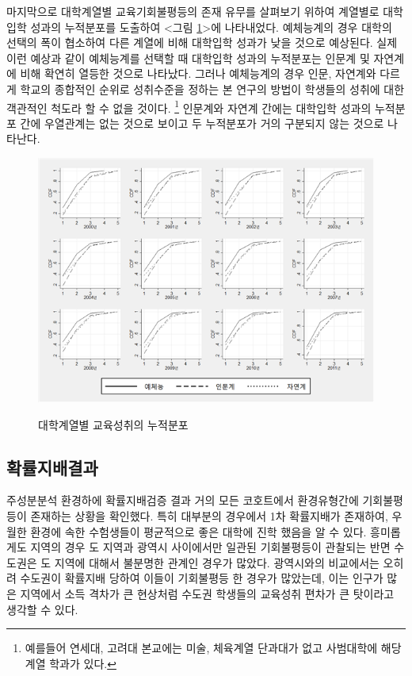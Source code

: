 마지막으로 대학계열별 교육기회불평등의 존재 유무를 살펴보기 위하여 계열별로 대학입학 성과의 누적분포를 도출하여 <그림 \ref{fig:goms_cdf_byfld}>에 나타내었다.
예체능계의 경우 대학의 선택의 폭이 협소하여 다른 계열에 비해 대학입학 성과가 낮을 것으로 예상된다.
 실제 이런 예상과 같이 예체능계를 선택할 때 대학입학 성과의 누적분포는 인문계 및 자연계에 비해 확연히 열등한 것으로 나타났다.
 그러나 예체능계의 경우 인문, 자연계와 다르게 학교의 종합적인 순위로 성취수준을 정하는 본 연구의 방법이 학생들의 성취에 대한 객관적인 척도라 할 수 없을 것이다.
 \footnote{ 예를들어 연세대, 고려대 본교에는 미술, 체육계열 단과대가 없고 사범대학에 해당계열 학과가 있다.}
 인문계와 자연계 간에는 대학입학 성과의 누적분포 간에 우열관계는 없는 것으로 보이고 두 누적분포가 거의 구분되지 않는 것으로 나타난다.
 
\begin{figure}
    \centering
    \caption{대학계열별 교육성취의 누적분포}
    \includegraphics[width=\textwidth]{figure/goms_cdf_byfld.png}
    \label{fig:goms_cdf_byfld}
\end{figure}

\subsection{확률지배결과}

주성분분석 환경하에 확률지배검증 결과 거의 모든 코호트에서 환경유형간에 기회불평등이 존재하는 상황을 확인했다.
특히 대부분의 경우에서 1차 확률지배가 존재하여, 우월한 환경에 속한 수험생들이 평균적으로 좋은 대학에 진학 했음을 알 수 있다.
흥미롭게도 지역의 경우 도 지역과 광역시 사이에서만 일관된 기회불평등이 관찰되는 반면 수도권은 도 지역에 대해서 불분명한 관계인 경우가 많았다.
 광역시와의 비교에서는 오히려 수도권이 확률지배 당하여 이들이 기회불평등 한 경우가 많았는데, 이는 인구가 많은 지역에서 소득 격차가 큰 현상처럼 수도권 학생들의 교육성취 편차가 큰 탓이라고 생각할 수 있다.
 
